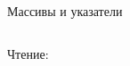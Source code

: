 \documentclass[aspectratio=169,14pt]{beamer}
\begin{document}
\begin{frame}[fragile,t]{Массивы и указатели}
\begin{onlyenv}
\begin{columns}
\begin{column}{0.5\textwidth}
                    \begin{center}
                        \begin{minipage}{0.9\textwidth}
                            {\color{maincolor}Чтение:} \\
                             \\
                        \end{minipage}
                    \end{center}
                \end{column}
            \end{columns}
        \end{onlyenv}
    \end{frame}

    \qnaframe
\end{document}
